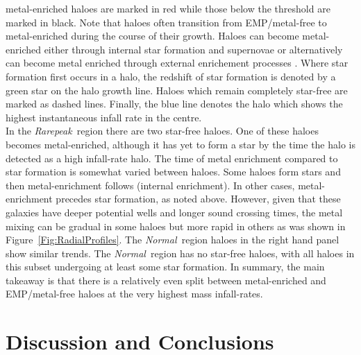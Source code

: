 \documentclass[graphics, twocolumn, usenatbib]{mn2e}
\newcommand{\rarepeak} {\textit{Rarepeak~}}
\newcommand{\normal} {\textit{Normal~}}
\begin{document}
metal-enriched haloes are marked in red while those below the threshold are marked in black. Note
that haloes often transition from EMP/metal-free to metal-enriched during the course of their growth. 
Haloes can become metal-enriched either through internal star formation and
supernovae or alternatively can become metal enriched through external enrichement processes
\citep[e.g.,][]{Smith_2015}. Where star formation first
occurs in a halo, the redshift of star formation is denoted by a green star on the halo growth line. 
Haloes which remain completely star-free are marked as dashed lines. Finally, the blue line denotes
the halo which shows the highest instantaneous infall rate in the centre. \\
\indent In the \rarepeak region there are two
star-free haloes. One of these haloes becomes metal-enriched, although it has yet to form
a star by the time the halo is detected as a high infall-rate halo. The time of metal enrichment
compared to star formation is somewhat varied between haloes. Some haloes form stars and then
metal-enrichment follows (internal enrichment). In other cases, metal-enrichment precedes
star formation, as noted above.
However, given that these galaxies have deeper potential wells and longer sound crossing times,
the metal mixing can be gradual in some haloes but more rapid in others as was shown in Figure~\ref{Fig:RadialProfiles}.
The \normal region haloes in the right hand panel show similar trends.
The \normal region has no star-free haloes, with all haloes in this subset undergoing at
least some star formation. In summary, the main takeaway is that there is a relatively even split
between metal-enriched and EMP/metal-free haloes at the very highest mass infall-rates. 

\section{Discussion and Conclusions} \label{Sec:Discussion}
\end{document}

